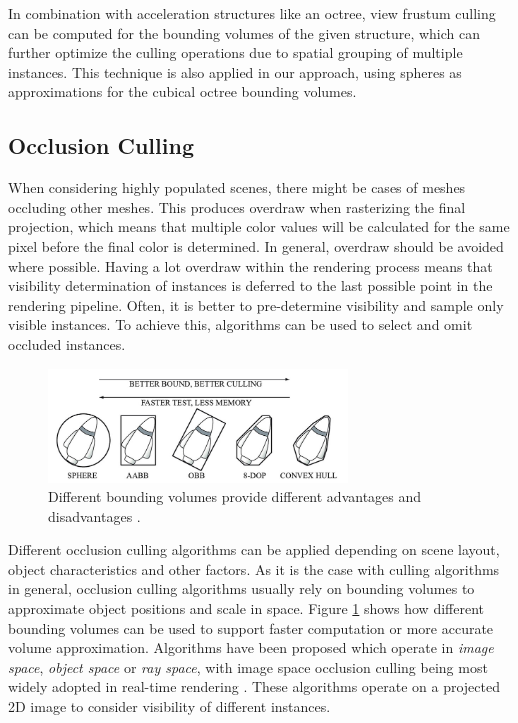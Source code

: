 \vspace{0.5cm}
\noindent
In combination with acceleration structures like an octree, view frustum culling can be computed for the bounding 
volumes of the given structure, which can further optimize the culling operations due to spatial grouping of multiple 
instances. This technique is also applied in our approach, using spheres as approximations for the cubical octree 
bounding volumes.


\subsection*{Occlusion Culling} \label{subsec-point-based-occlusion-culling}

When considering highly populated scenes, there might be cases of meshes occluding other meshes. This produces overdraw 
when rasterizing the final projection, which means that multiple color values will be calculated for the same pixel 
before the final color is determined. In general, overdraw should be avoided where possible. Having a lot overdraw 
within the rendering process means that visibility determination of instances is deferred to the last possible point in 
the rendering pipeline. Often, it is better to pre-determine visibility and sample only visible instances. To achieve 
this, algorithms can be used to select and omit occluded instances. \\

\begin{figure}[h]
    \centering
    \includegraphics[width=300px]{images/graphics/bounding-volume-quality.jpg}
    \caption{Different bounding volumes provide different advantages and disadvantages \cite{Six2021}.}
    \label{fig:bounding-volumes}
\end{figure}

\noindent
Different occlusion culling algorithms can be applied depending on scene layout, object characteristics and other factors.
As it is the case with culling algorithms in general, occlusion culling algorithms usually rely on bounding volumes to 
approximate object positions and scale in space. Figure \ref{fig:bounding-volumes} shows how different bounding volumes 
can be used to support faster computation or more accurate volume approximation. Algorithms have been proposed which 
operate in \emph{image space}, \emph{object space} or \emph{ray space}, with image space occlusion culling being most 
widely adopted in real-time rendering \cite{AkenineMoeller2018}. These algorithms operate on a projected 2D image to 
consider visibility of different instances.  


